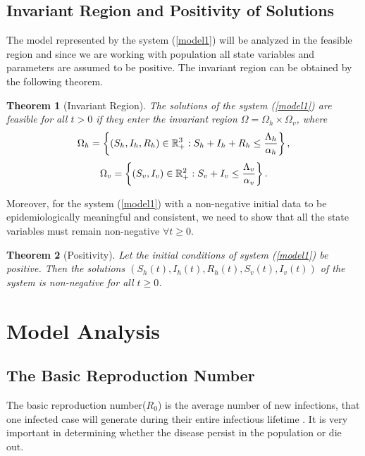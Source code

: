 \documentclass[review]{elsarticle}
\newtheorem{theorem}{Theorem}
\begin{document}
\subsection{Invariant Region and Positivity of Solutions}

The model represented by the system (\ref{model1}) will be analyzed in the feasible region and since we are working with
population all state variables and parameters are assumed to be positive. The invariant region can be obtained by the
following theorem.
\begin{theorem}[Invariant Region]
The solutions of the system (\ref{model1}) are feasible for all $t>0$ if they enter the invariant region
$\Omega =\Omega_h\times \Omega_v$, where
\begin{align*}
\Omega_h=\left\{(S_h,I_h,R_h)\in\Bbb R_+^3: S_h+I_h+R_h \leq\frac{\Lambda_h}{\alpha_h} \right\},
\end{align*}
\begin{align*}
\Omega_v=\left\{(S_v,I_v)\in\Bbb R_+^2: S_v+I_v \leq\frac{\Lambda_v}{\alpha_v} \right\}.
\end{align*}
\end{theorem}

Moreover, for the system (\ref{model1}) with a non-negative initial data to be epidemiologically meaningful and consistent, we need to show that all the state variables must remain non-negative $\forall t\geq 0$.

\begin{theorem}[Positivity]
Let the initial conditions of system (\ref{model1}) be positive. Then the solutions
$(S_h(t),I_h(t),R_h(t),S_v(t),I_v(t))$ of the system is non-negative for all  $t\geq 0$.
\end{theorem}

\section{Model Analysis}

\subsection{The Basic Reproduction Number}

The basic reproduction number($R_0$) is the average number of new infections, that one infected case will generate during their entire infectious lifetime \cite{Kenrad,Addo,heffernan2005}. It is very important in determining whether the disease persist in the population or die out.
\end{document}
